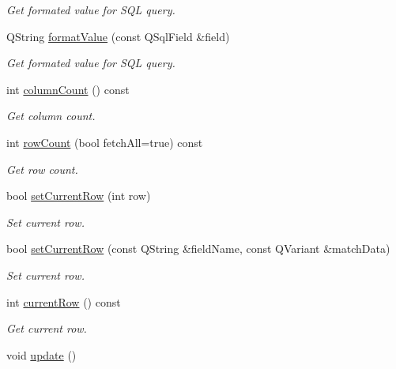 \begin{DoxyCompactItemize}
\begin{DoxyCompactList}\small\item\em Get formated value for S\-Q\-L query. \end{DoxyCompactList}\item 
Q\-String \hyperlink{classmdt_abstract_sql_table_controller_ae42bd2919d96b66e9dcd73f041b6ad58}{format\-Value} (const Q\-Sql\-Field \&field)
\begin{DoxyCompactList}\small\item\em Get formated value for S\-Q\-L query. \end{DoxyCompactList}\item 
int \hyperlink{classmdt_abstract_sql_table_controller_a0dd5f5dc2934dc16ee80cbe03fc0473b}{column\-Count} () const 
\begin{DoxyCompactList}\small\item\em Get column count. \end{DoxyCompactList}\item 
int \hyperlink{classmdt_abstract_sql_table_controller_a91b9d8a7e7ab41e142baf9ba149c428e}{row\-Count} (bool fetch\-All=true) const 
\begin{DoxyCompactList}\small\item\em Get row count. \end{DoxyCompactList}\item 
bool \hyperlink{classmdt_abstract_sql_table_controller_a305a1a31db83f0f49f4a4166c4d1cad1}{set\-Current\-Row} (int row)
\begin{DoxyCompactList}\small\item\em Set current row. \end{DoxyCompactList}\item 
bool \hyperlink{classmdt_abstract_sql_table_controller_a496e148f79e951c42bb13230ea49ccd1}{set\-Current\-Row} (const Q\-String \&field\-Name, const Q\-Variant \&match\-Data)
\begin{DoxyCompactList}\small\item\em Set current row. \end{DoxyCompactList}\item 
int \hyperlink{classmdt_abstract_sql_table_controller_a111a56537a1ed200e631e1efcd4a2244}{current\-Row} () const 
\begin{DoxyCompactList}\small\item\em Get current row. \end{DoxyCompactList}\item 
void \hyperlink{classmdt_abstract_sql_table_controller_a402c074ee50e4c35f763391e11475ea2}{update} ()

\end{DoxyCompactItemize}
